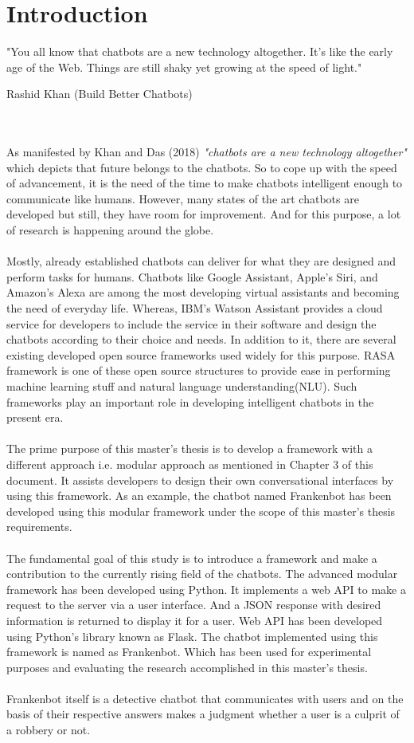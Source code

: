 \chapter{Introduction\label{cha:chapter1}}
\epigraph{"You all know that chatbots are a new technology altogether. It’s like the early age of the Web. Things are still shaky yet growing at the speed of light."}{Rashid Khan (Build Better Chatbots)}
\\~\\
As manifested by Khan and Das (2018) {\textit{"chatbots are a new technology altogether"} \cite{buildBetterChatbots}} which depicts that future belongs to the chatbots. So to cope up with the speed of advancement, it is the need of the time to make chatbots intelligent enough to communicate like humans. However, many states of the art chatbots are developed but still, they have room for improvement. And for this purpose, a lot of research is happening around the globe.
\\~\\
Mostly, already established chatbots can deliver for what they are designed and perform tasks for humans. Chatbots like Google Assistant, Apple's Siri, and Amazon's Alexa are among the most developing virtual assistants and becoming the need of everyday life. Whereas, IBM's Watson Assistant provides a cloud service for developers to include the service in their software and design the chatbots according to their choice and needs. In addition to it, there are several existing developed open source frameworks used widely for this purpose. RASA framework is one of these open source structures to provide ease in performing machine learning stuff and natural language understanding(NLU). Such frameworks play an important role in developing intelligent chatbots in the present era. 
\\~\\
The prime purpose of this master's thesis is to develop a framework with a different approach i.e. modular approach as mentioned in Chapter 3 of this document. It assists developers to design their own conversational interfaces by using this framework. As an example, the chatbot named Frankenbot has been developed using this modular framework under the scope of this master's thesis requirements.
\\~\\
The fundamental goal of this study is to introduce a framework and make a contribution to the currently rising field of the chatbots. The advanced modular framework has been developed using Python. It implements a web API to make a request to the server via a user interface. And a JSON response with desired information is returned to display it for a user. Web API has been developed using Python's library known as Flask. The chatbot implemented using this framework is named as Frankenbot. Which has been used for experimental purposes and evaluating the research accomplished in this master's thesis. 
\\~\\
Frankenbot itself is a detective chatbot that communicates with users and on the basis of their respective answers makes a judgment whether a user is a culprit of a robbery or not.

